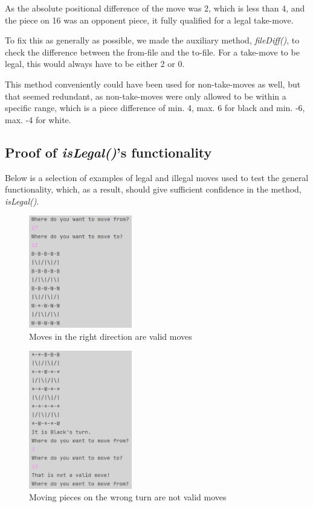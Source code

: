 \documentclass[12pt, a4paper]{article}
\begin{document}
As the absolute positional difference of the move was 2, which is less than 4, and the piece on 16 was an opponent piece, it fully qualified for a legal take-move. \par To fix this as generally as possible, we made the auxiliary method, \emph{fileDiff()}, to check the difference between the from-file and the to-file. For a take-move to be legal, this would always have to be either 2 or 0. \par This method conveniently could have been used for non-take-moves as well, but that seemed redundant, as non-take-moves were only allowed to be within a specific range, which is a piece difference of min. 4, max. 6 for black and min. -6, max. -4 for white.

\subsection{Proof of \emph{isLegal()}’s functionality}
Below is a selection of examples of legal and illegal moves used to test the general functionality, which, as a result, should give sufficient confidence in the method, \emph{isLegal()}.

\begin{figure}[h]
	\centering
	\caption*{Moves in the right direction are valid moves}
	\includegraphics[width=0.4\textwidth]{isLegalProf/LovligeTrækOgTakeMoves/DuMåGodLaveLovligeTræk.png}	
\end{figure}

\begin{figure}[h]
	\centering
	\caption*{Moving pieces on the wrong turn are not valid moves}
	\includegraphics[width=0.4\textwidth]{isLegalProf/MåIkkeRykkeTilFelterDerStårEnBrik.png}	
\end{figure}
\end{document}
